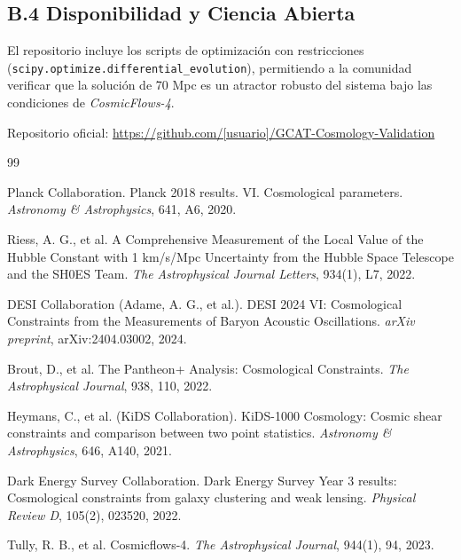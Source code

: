 \documentclass[12pt, a4paper]{article}
\theoremstyle{plain}
\theoremstyle{definition}
\begin{document}
\subsection{B.4 Disponibilidad y Ciencia Abierta}

El repositorio incluye los scripts de optimización con restricciones (\texttt{scipy.optimize.differential\_evolution}), permitiendo a la comunidad verificar que la solución de 70 Mpc es un atractor robusto del sistema bajo las condiciones de \textit{CosmicFlows-4}.

Repositorio oficial: \url{https://github.com/[usuario]/GCAT-Cosmology-Validation}


\begin{thebibliography}{99}
\small

Planck Collaboration.
\newblock Planck 2018 results. VI. Cosmological parameters.
\newblock \textit{Astronomy \& Astrophysics}, 641, A6, 2020.

Riess, A. G., et al.
\newblock A Comprehensive Measurement of the Local Value of the Hubble Constant with 1 km/s/Mpc Uncertainty from the Hubble Space Telescope and the SH0ES Team.
\newblock \textit{The Astrophysical Journal Letters}, 934(1), L7, 2022.

DESI Collaboration (Adame, A. G., et al.).
\newblock DESI 2024 VI: Cosmological Constraints from the Measurements of Baryon Acoustic Oscillations.
\newblock \textit{arXiv preprint}, arXiv:2404.03002, 2024.

Brout, D., et al.
\newblock The Pantheon+ Analysis: Cosmological Constraints.
\newblock \textit{The Astrophysical Journal}, 938, 110, 2022.

Heymans, C., et al. (KiDS Collaboration).
\newblock KiDS-1000 Cosmology: Cosmic shear constraints and comparison between two point statistics.
\newblock \textit{Astronomy \& Astrophysics}, 646, A140, 2021.

Dark Energy Survey Collaboration.
\newblock Dark Energy Survey Year 3 results: Cosmological constraints from galaxy clustering and weak lensing.
\newblock \textit{Physical Review D}, 105(2), 023520, 2022.

Tully, R. B., et al.
\newblock Cosmicflows-4.
\newblock \textit{The Astrophysical Journal}, 944(1), 94, 2023.


\end{thebibliography}
\end{document}
